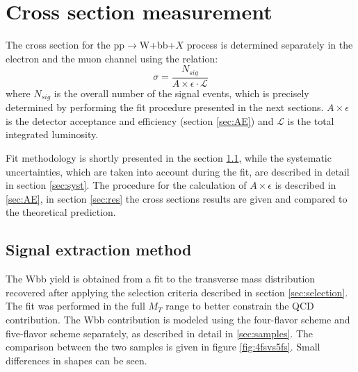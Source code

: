 \chapter{Cross section measurement} %

\label{Chapter7} %



The cross section for the pp$\rightarrow$W+bb+$X$ process is determined separately in the electron and the muon channel using the relation:
\begin{equation}
\sigma = \frac{N_{sig}}{A\times \epsilon \cdot \mathcal{L}}
\label{equ:xsec}
\end{equation}
where $N_{sig}$ is the overall number of the signal events, which is precisely determined by performing the fit procedure presented in the next sections. $A\times \epsilon$ is the detector acceptance and efficiency (section \ref{sec:AE}) and $\mathcal{L}$ is the total integrated luminosity. 
\par Fit methodology is shortly presented in the section \ref{sec:fit}, while the systematic uncertainties, which are taken into account during the fit, are described in detail in section \ref{sec:syst}. The procedure for the calculation of $A\times \epsilon$ is described in \ref{sec:AE}, in section \ref{sec:res} the cross sections results are given and compared to the theoretical prediction. 


\section{Signal extraction method}
\label{sec:fit}

The Wbb yield is obtained from a fit to the transverse mass distribution recovered after applying the selection criteria described in section \ref{sec:selection}. The fit was performed in the full $M_T$ range to better constrain the QCD contribution.  
The Wbb contribution is modeled using the four-flavor scheme and five-flavor scheme separately, as described in detail in \ref{sec:samples}. The comparison between the two samples is given in figure \ref{fig:4fsvs5fs}. Small differences in shapes can be seen.

